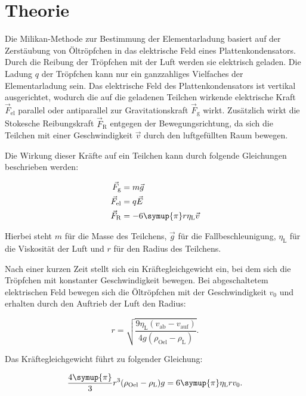 \section{Theorie}
\label{sec:Theorie}

Die Milikan-Methode zur Bestimmung der Elementarladung basiert auf der Zerstäubung von Öltröpfchen in das elektrische Feld eines Plattenkondensators. 
Durch die Reibung der Tröpfchen mit der Luft werden sie elektrisch geladen. Die Ladung $q$ der Tröpfchen kann nur ein ganzzahliges Vielfaches der 
Elementarladung sein. Das elektrische Feld des Plattenkondensators ist vertikal ausgerichtet, wodurch die auf die geladenen Teilchen wirkende 
elektrische Kraft $\vec{F}_\text{el}$ parallel oder antiparallel zur Gravitationskraft $\vec{F}_\text{g}$ wirkt. Zusätzlich wirkt die Stokesche 
Reibungskraft $\vec{F}_\text{R}$ entgegen der Bewegungsrichtung, da sich die Teilchen mit einer Geschwindigkeit $\vec{v}$ durch den luftgefüllten 
Raum bewegen.

Die Wirkung dieser Kräfte auf ein Teilchen kann durch folgende Gleichungen beschrieben werden:

\begin{align}
    \label{eqn:Kraefte}
    \vec{F}_\text{g} &= m \vec{g} \\
    \vec{F}_\text{el} &= q \vec{E} \\
    \vec{F}_\text{R} &= -6\symup{\pi}r\eta_\text{L} \vec{v}
\end{align}

Hierbei steht $m$ für die Masse des Teilchens, $\vec{g}$ für die Fallbeschleunigung, $\eta_\text{L}$ für die Viskosität der Luft und $r$ für den Radius 
des Teilchens.

Nach einer kurzen Zeit stellt sich ein Kräftegleichgewicht ein, bei dem sich die Tröpfchen mit konstanter Geschwindigkeit bewegen. Bei abgeschaltetem 
elektrischen Feld bewegen sich die Öltröpfchen mit der Geschwindigkeit $v_0$ und erhalten durch den Auftrieb der Luft den Radius:

\begin{equation}
    \label{eqn:Radius}
    r = \sqrt{\frac{9 \eta_\text{L}(v_\text{ab} - v_\text{auf})}{4g(\rho_\text{Oel}- \rho_\text{L})}}.
\end{equation}

Das Kräftegleichgewicht führt zu folgender Gleichung:

\begin{equation*}
    \frac{4\symup{\pi}}{3}r^3(\rho_\text{Oel}- \rho_\text{L})g = 6 \symup{\pi} \eta_\text{L}r v_0.
\end{equation*}


